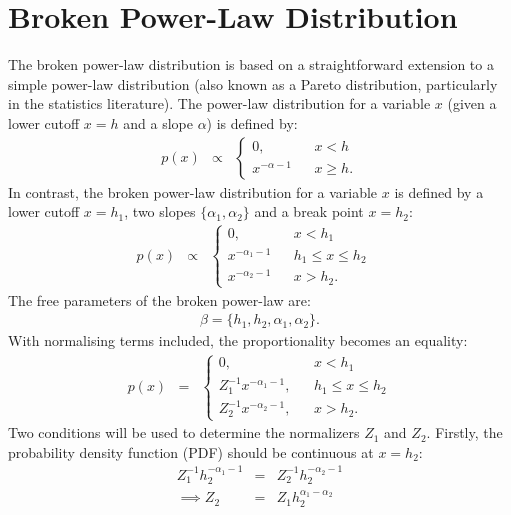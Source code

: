 \documentclass[12pt, preprint]{aastex}
\begin{document}
\appendix

\section{Broken Power-Law Distribution}\label{power_law}
The broken power-law distribution is based on a straightforward extension
to a simple power-law distribution (also known as a Pareto distribution,
particularly in the statistics literature). The power-law distribution for a
variable $x$ (given a lower cutoff $x=h$ and a slope $\alpha$) is defined by:
\begin{eqnarray}
p(x) &\propto&
\left\{
\begin{array}{lcl}
0, & & x < h \\
x^{-\alpha - 1} & & x \geq h.
\end{array}
\right.
\end{eqnarray}
In contrast, the broken power-law distribution for a variable $x$ is defined by
a lower cutoff $x=h_1$, two slopes $\{\alpha_1, \alpha_2\}$ and a break point
$x=h_2$:
\begin{eqnarray}
p(x) &\propto&
\left\{
\begin{array}{lcrl}
0, & & x < h_1 & \\
x^{-\alpha_1 - 1} & & h_1 \leq x \leq h_2 & \\
x^{-\alpha_2 - 1} & & x > h_2.
\end{array}
\right.
\end{eqnarray}
The free parameters of the broken power-law are:
\begin{eqnarray}
\beta = \{h_1, h_2, \alpha_1, \alpha_2\}.
\end{eqnarray}
With normalising terms included, the proportionality becomes an equality:
\begin{eqnarray}
p(x) &=&
\left\{
\begin{array}{lcr}
0, & & x < h_1 \\
Z_1^{-1}x^{-\alpha_1 - 1}, & & h_1 \leq x \leq h_2 \\
Z_2^{-1}x^{-\alpha_2 - 1}, & & x > h_2.
\end{array}
\right.
\end{eqnarray}
Two conditions will be used to determine the normalizers $Z_1$ and $Z_2$.
Firstly, the probability density function (PDF) should be continuous at $x=h_2$:
\begin{eqnarray}
Z_1^{-1}h_2^{-\alpha_1 - 1} &=& Z_2^{-1}h_2^{-\alpha_2 - 1}\\
\implies
Z_2 &=& Z_1h_2^{\alpha_1-\alpha_2}
\end{eqnarray}
\end{document}
